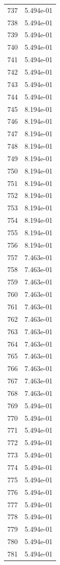 \documentclass[12pt]{article}
\begin{document}
\begin{longtable}{@{}cc@{}}
737 & 5.494e-01 \\
738 & 5.494e-01 \\
739 & 5.494e-01 \\
740 & 5.494e-01 \\
741 & 5.494e-01 \\
742 & 5.494e-01 \\
743 & 5.494e-01 \\
744 & 5.494e-01 \\
745 & 8.194e-01 \\
746 & 8.194e-01 \\
747 & 8.194e-01 \\
748 & 8.194e-01 \\
749 & 8.194e-01 \\
750 & 8.194e-01 \\
751 & 8.194e-01 \\
752 & 8.194e-01 \\
753 & 8.194e-01 \\
754 & 8.194e-01 \\
755 & 8.194e-01 \\
756 & 8.194e-01 \\
757 & 7.463e-01 \\
758 & 7.463e-01 \\
759 & 7.463e-01 \\
760 & 7.463e-01 \\
761 & 7.463e-01 \\
762 & 7.463e-01 \\
763 & 7.463e-01 \\
764 & 7.463e-01 \\
765 & 7.463e-01 \\
766 & 7.463e-01 \\
767 & 7.463e-01 \\
768 & 7.463e-01 \\
769 & 5.494e-01 \\
770 & 5.494e-01 \\
771 & 5.494e-01 \\
772 & 5.494e-01 \\
773 & 5.494e-01 \\
774 & 5.494e-01 \\
775 & 5.494e-01 \\
776 & 5.494e-01 \\
777 & 5.494e-01 \\
778 & 5.494e-01 \\
779 & 5.494e-01 \\
780 & 5.494e-01 \\
781 & 5.494e-01 \\

\end{longtable}
\end{document}
